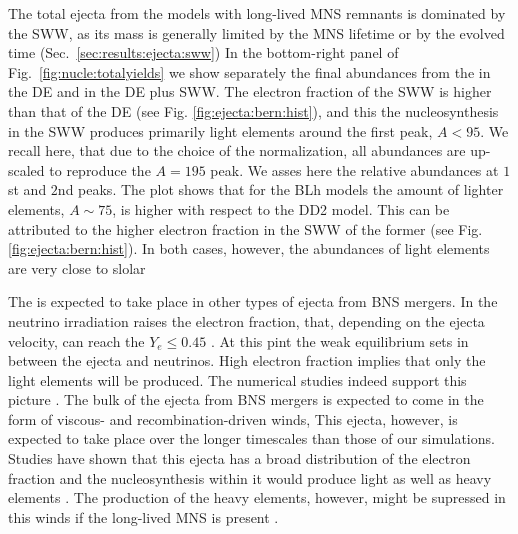 The total ejecta from the models with long-lived \ac{MNS} remnants is dominated by
the \ac{SWW}, as its mass is generally limited by the \ac{MNS} lifetime 
or by the evolved time (Sec.~\ref{sec:results:ejecta:sww})
In the bottom-right panel of Fig.~\ref{fig:nucle:totalyields} we show separately the 
final abundances from the \rproc{} in the \ac{DE} and in the \ac{DE} plus \ac{SWW}. 
The electron fraction of the \ac{SWW} is higher than that of the \ac{DE} 
(see Fig. \ref{fig:ejecta:bern:hist}), and this the \rproc{} nucleosynthesis in the 
\ac{SWW} produces primarily light elements around the first \rproc{} peak, $A<95$.
We recall here, that due to the choice of the normalization, all abundances are up-scaled 
to reproduce the $A=195$ peak. We asses here the relative abundances at $1$st and $2$nd
\rproc{} peaks.
The plot shows that for the BLh models the amount of lighter elements, $A\sim75$, is higher with 
respect to the DD2 model. This can be attributed to the higher electron fraction in the 
\ac{SWW} of the former (see Fig. \ref{fig:ejecta:bern:hist}).
In both cases, however, the abundances of light elements are very close to slolar 

The \rproc{} is expected to take place in other types of ejecta from \ac{BNS} mergers.
In \nwind{} the neutrino irradiation raises the electron fraction, that, depending 
on the ejecta velocity, can reach the $Y_e\leq 0.45$ \citep{Qian:1996xt}. 
At this pint the weak equilibrium sets in between the ejecta and neutrinos.
High electron fraction implies that only the light elements will be produced.
The numerical studies indeed support this picture 
\citep{Dessart:2008zd,Perego:2014fma,Just:2014fka,Martin:2015hxa,Foucart:2016rxm}. 
The bulk of the ejecta from \ac{BNS} mergers is expected to come in the form of 
viscous- and recombination-driven winds, This ejecta, however, is expected to take 
place over the longer timescales than those of our simulations.
Studies have shown that this ejecta has a broad distribution of the electron fraction 
and the \rproc{} nucleosynthesis within it would produce light as well as heavy elements
\citep{Fernandez:2013tya,Just:2014fka,Wu:2016pnw,Siegel:2017nub,Fujibayashi:2017puw,Fernandez:2018kax}.
The production of the heavy \rproc{} elements, however, might be supressed in this winds
if the long-lived \ac{MNS} is present \citep{Metzger:2014ila,Lippuner:2017bfm}.